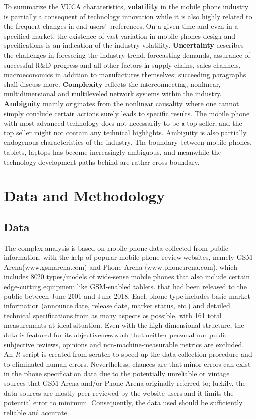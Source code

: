 \documentclass[utf8,english]{gradu3}
\begin{document}
To summarize the VUCA charateristics, \textbf{volatility} in the mobile phone industry is partially a consequent of technology innovation while it is also highly related to the frequent changes in end users’ preferences. On a given time and even in a specified market, the existence of vast variation in mobile phones design and specifications is an indication of the industry volatility. \textbf{Uncertainty} describes the challenges in foreseeing the industry trend, forecasting demands, assurance of successful R\&D progress and all other factors in supply chains, sales channels, macroeconomics in addition to manufactures themselves; succeeding paragraphs shall discuss more. \textbf{Complexity} reflects the interconnecting, nonlinear, multidimensional and multileveled network systems within the industry. \textbf{Ambiguity} mainly originates from the nonlinear causality, where one cannot simply conclude certain actions surely leads to specific results. The mobile phone with most advanced technology does not necessarily to be a top seller, and the top seller might not contain any technical highlights. Ambiguity is also partially endogenous characteristics of the industry. The boundary between mobile phones, tablets, laptops has become increasingly ambiguous, and meanwhile the technology development paths behind are rather cross-boundary.

\chapter{Data and Methodology}

\section{Data}

The complex analysis is based on mobile phone data collected from public information, with the help of popular mobile phone review websites, namely GSM Arena(www.gsmarena.com) and Phone Arena (www.phonearena.com), which includes 8020 types/models of wide-sense mobile phones that also include certain edge-cutting equipment like GSM-enabled tablets. that had been released to the public between June 2001 and June 2018. Each phone type includes basic market information (announce date, release date, market status, etc.) and detailed technical specifications from as many aspects as possible, with 161 total measurements at ideal situation. Even with the high dimensional structure, the data is featured for its objectiveness such that neither personal nor public subjective reviews, opinions and non-machine-measurable metrics are excluded. An \textit{R}-script is created from scratch to speed up the data collection procedure and to eliminated human errors. Nevertheless, chances are that minor errors can exist in the phone specification data due to the potentially unreliable or vintage sources that GSM Arena and/or Phone Arena originally referred to; luckily, the data sources are mostly peer-reviewed by the website users and it limits the potential error to minimum. Consequently, the data used should be sufficiently reliable and accurate.
\end{document}

